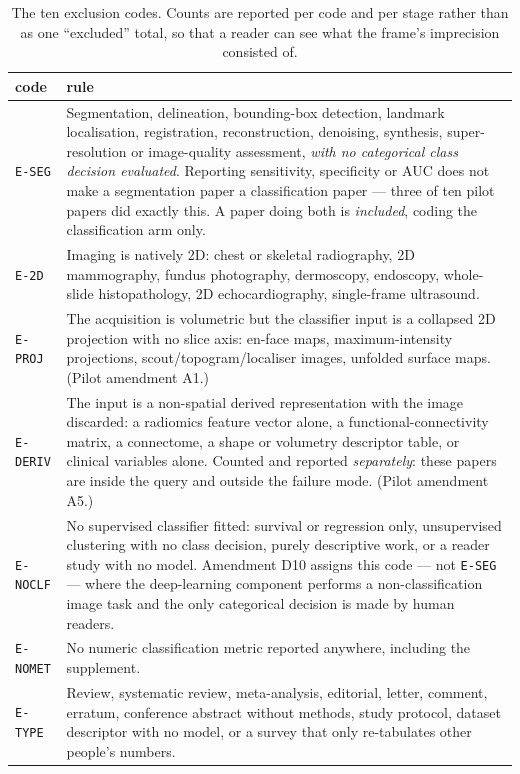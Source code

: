 \documentclass[11pt,a4paper]{article}
\begin{document}
\begin{table}[htbp]
\centering
\caption{The ten exclusion codes. Counts are reported per code and per stage rather
than as one ``excluded'' total, so that a reader can see what the frame's imprecision
consisted of.}
\small
\begin{tabular}{@{}lL{11.4cm}@{}}
\toprule
code & rule \\
\midrule
\texttt{E-SEG}    & Segmentation, delineation, bounding-box detection, landmark localisation, registration, reconstruction, denoising, synthesis, super-resolution or image-quality assessment, \emph{with no categorical class decision evaluated}. Reporting sensitivity, specificity or AUC does not make a segmentation paper a classification paper --- three of ten pilot papers did exactly this. A paper doing both is \emph{included}, coding the classification arm only. \\
\texttt{E-2D}     & Imaging is natively 2D: chest or skeletal radiography, 2D mammography, fundus photography, dermoscopy, endoscopy, whole-slide histopathology, 2D echocardiography, single-frame ultrasound. \\
\texttt{E-PROJ}   & The acquisition is volumetric but the classifier input is a collapsed 2D projection with no slice axis: en-face maps, maximum-intensity projections, scout/topogram/localiser images, unfolded surface maps. (Pilot amendment A1.) \\
\texttt{E-DERIV}  & The input is a non-spatial derived representation with the image discarded: a radiomics feature vector alone, a functional-connectivity matrix, a connectome, a shape or volumetry descriptor table, or clinical variables alone. Counted and reported \emph{separately}: these papers are inside the query and outside the failure mode. (Pilot amendment A5.) \\
\texttt{E-NOCLF}  & No supervised classifier fitted: survival or regression only, unsupervised clustering with no class decision, purely descriptive work, or a reader study with no model. Amendment D10 assigns this code --- not \texttt{E-SEG} --- where the deep-learning component performs a non-classification image task and the only categorical decision is made by human readers. \\
\texttt{E-NOMET}  & No numeric classification metric reported anywhere, including the supplement. \\
\texttt{E-TYPE}   & Review, systematic review, meta-analysis, editorial, letter, comment, erratum, conference abstract without methods, study protocol, dataset descriptor with no model, or a survey that only re-tabulates other people's numbers. \\

\end{tabular}
\end{table}
\end{document}
